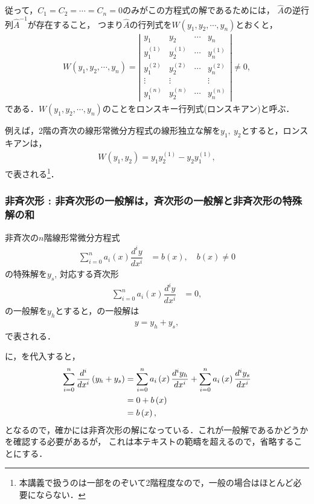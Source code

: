 従って，$C_1 = C_2 = \cdots = C_n = 0$のみがこの方程式の解であるためには，
$\hat{A}$の逆行列$\hat{A}^{-1}$が存在すること，
つまり$\hat{A}$の行列式を$W\left(y_1, y_2, \cdots , y_n\right)$とおくと，
\begin{align}
 W\left(y_1,y_2,\cdots, y_n\right) = 
 \left|\begin{array}{cccc}
y_{1} & y_{2} & \cdots & y_{n}\\
y_{1}^{\left(1\right)} & y_{2}^{\left(1\right)} & \cdots & y_{n}^{\left(1\right)}\\
y_{1}^{\left(2\right)} & y_{2}^{\left(2\right)} & \cdots & y_{n}^{\left(2\right)}\\
\vdots & \vdots &  & \vdots\\
y_{1}^{\left(n\right)} & y_{2}^{\left(n\right)} & \cdots & y_{n}^{\left(n\right)}
\end{array}\right|
 \neq 0,
\end{align}
である．$W\left(y_1,y_2,\cdots,y_n\right)$のことをロンスキー行列式(ロンスキアン)と呼ぶ．

例えば，2階の斉次の線形常微分方程式の線形独立な解を$y_1,~y_2$とすると，ロンスキアンは，
\begin{align}
  W\left(y_1,y_2\right) = y_1 y_2^{(1)} - y_2 y_1^{(1)}, 
\end{align}
で表される\footnote{本講義で扱うのは一部をのぞいて2階程度なので，一般の場合はほとんど必要にならない．}．

\subsubsection{非斉次形 : 非斉次形の一般解は，斉次形の一般解と非斉次形の特殊解の和\label{sec:inhomo_strategy}}
\begin{shadebox}
非斉次の$n$階線形常微分方程式
\begin{align}
 \sum_{i=0}^{n}a_{i}\left(x\right)\dfrac{d^{i}y}{dx^{i}} & =b\left(x\right), \quad b\left(x\right) \neq 0 
\label{eq:inhomo_linear}
\end{align}
の特殊解を$y_s$, 対応する斉次形
\begin{align}
 \sum_{i=0}^{n}a_{i}\left(x\right)\dfrac{d^{i}y}{dx^{i}} & = 0,
\end{align}
の一般解を$y_h$とすると，の一般解は
\begin{align}
  y = y_{h} + y_{s}, \label{eq:inhomo_linear_sol}
\end{align}
で表される．
\end{shadebox}
%
に，を代入すると，
\begin{align}
 \sum_{i=0}^{n}\dfrac{d^{i}}{dx^{i}}\left(y_{h}+y_{s}\right) & =\sum_{i=0}^{n}a_{i}\left(x\right)\dfrac{d^{i}y_{h}}{dx^{i}}+\sum_{i=0}^{n}a_{i}\left(x\right)\dfrac{d^{i}y_{s}}{dx^{i}}\notag\\
 & =0+b\left(x\right)\notag\\
 & =b\left(x\right), 
\end{align}
となるので，確かには非斉次形の解になっている．これが一般解であるかどうかを確認する必要があるが，
これは本テキストの範疇を超えるので，省略することにする．

